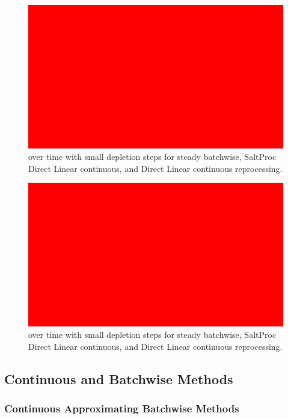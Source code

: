 \begin{figure}[H]
  \centering
  \includegraphics[scale=0.1]{images/placeholder.png}
  \caption{ over time with small depletion steps for steady batchwise, SaltProc Direct Linear continuous, and Direct Linear continuous reprocessing.}
   \label{fig:SPCR-cont-135Xe-3}
\end{figure}

\begin{figure}[H]
  \centering
  \includegraphics[scale=0.1]{images/placeholder.png}
  \caption{ over time with small depletion steps for steady batchwise, SaltProc Direct Linear continuous, and Direct Linear continuous reprocessing.}
   \label{fig:SPCR-cont-136Xe-3}
\end{figure}

\subsection{Continuous and Batchwise Methods}

\subsubsection{Continuous Approximating Batchwise Methods}

